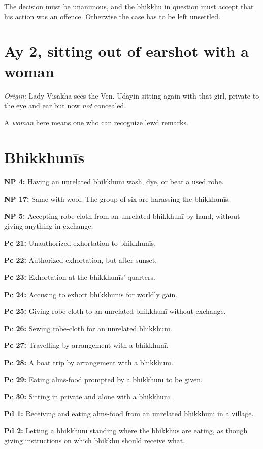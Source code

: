 The decision must be unanimous, and the bhikkhu in question must accept
that his action was an offence. Otherwise the case has to be left
unsettled.

\section{Ay 2, sitting out of earshot with a woman}

\emph{Origin:} Lady Visākhā sees the Ven. Udāyin sitting again with that
girl, private to the eye and ear but now \emph{not} concealed.

A \emph{woman} here means one who can recognize lewd remarks.

\clearpage

\section{Bhikkhunīs}

\textbf{NP 4:} Having an unrelated bhikkhunī wash, dye, or beat a used
robe.

\textbf{NP 17:} Same with wool. The group of six are harassing the
bhikkhunīs.

\textbf{NP 5:} Accepting robe-cloth from an unrelated bhikkhunī by hand,
without giving anything in exchange.

\textbf{Pc 21:} Unauthorized exhortation to bhikkhunīs.

\textbf{Pc 22:} Authorized exhortation, but after sunset.

\textbf{Pc 23:} Exhortation at the bhikkhunīs' quarters.

\textbf{Pc 24:} Accusing to exhort bhikkhunīs for worldly gain.

\textbf{Pc 25:} Giving robe-cloth to an unrelated bhikkhunī without
exchange.

\textbf{Pc 26:} Sewing robe-cloth for an unrelated bhikkhunī.

\textbf{Pc 27:} Travelling by arrangement with a bhikkhunī.

\textbf{Pc 28:} A boat trip by arrangement with a bhikkhunī.

\textbf{Pc 29:} Eating alms-food prompted by a bhikkhunī to be given.

\textbf{Pc 30:} Sitting in private and alone with a bhikkhunī.

\textbf{Pd 1:} Receiving and eating alms-food from an unrelated
bhikkhunī in a village.

\textbf{Pd 2:} Letting a bhikkhunī standing where the bhikkhus are
eating, as though giving instructions on which bhikkhu should receive
what.

